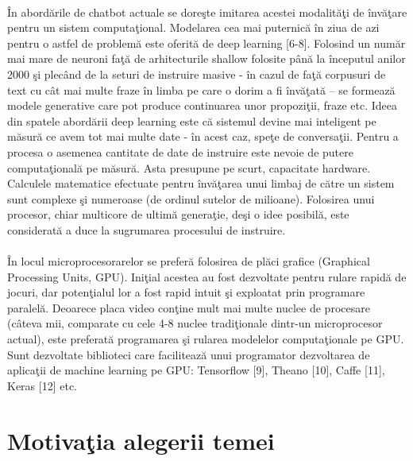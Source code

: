 \paragraph{}
\^ In abord\u arile de chatbot actuale se dore\c ste imitarea acestei modalit\u a\c ti de \^ inv\u a\c tare pentru un sistem computa\c tional. Modelarea cea mai puternic\u a \^ in ziua de azi pentru o astfel de problem\u a este oferit\u a de deep learning [6-8]. Folosind un num\u ar mai mare de neuroni fa\c t\u a de arhitecturile shallow folosite p\^ an\u a la \^ inceputul anilor 2000 \c si plec\^ and de la seturi de instruire masive - \^ in cazul de fa\c t\u a corpusuri de text cu c\^ at mai multe fraze \^ in limba pe care o dorim a fi \^ inv\u a\c tat\u a – se formeaz\u a modele generative care pot produce continuarea unor propozi\c tii, fraze etc. Ideea din spatele abord\u arii deep learning este c\u a sistemul devine mai inteligent pe m\u asur\u a ce avem tot mai multe date - \^ in acest caz, spe\c te de conversa\c tii. Pentru a procesa o asemenea cantitate de date de instruire este nevoie de putere computa\c tional\u a pe m\u asur\u a. Asta presupune pe scurt, capacitate hardware. Calculele matematice efectuate pentru \^ inv\u a\c tarea unui limbaj de c\u atre un sistem sunt complexe \c si numeroase (de ordinul sutelor de milioane). Folosirea unui procesor, chiar multicore de ultim\u a genera\c tie, de\c si o idee posibil\u a, este considerat\u a a duce la sugrumarea procesului de instruire. 

\paragraph{}
\^ In locul microprocesorarelor se prefer\u a folosirea de pl\u aci grafice (Graphical Processing Units, GPU). Ini\c tial acestea au fost dezvoltate pentru rulare rapid\u a de jocuri, dar poten\c tialul lor a fost rapid intuit \c si exploatat prin programare paralel\u a. Deoarece placa video con\c tine mult mai multe nuclee de procesare (c\^ ateva mii, comparate cu cele 4-8 nuclee tradi\c tionale dintr-un microprocesor actual), este preferat\u a programarea \c si rularea modelelor computa\c tionale pe GPU. Sunt dezvoltate biblioteci care faciliteaz\u a unui programator dezvoltarea de aplica\c tii de machine learning pe GPU: Tensorflow [9], Theano [10], Caffe [11], Keras [12] etc.

\section{Motiva\c tia alegerii temei}
